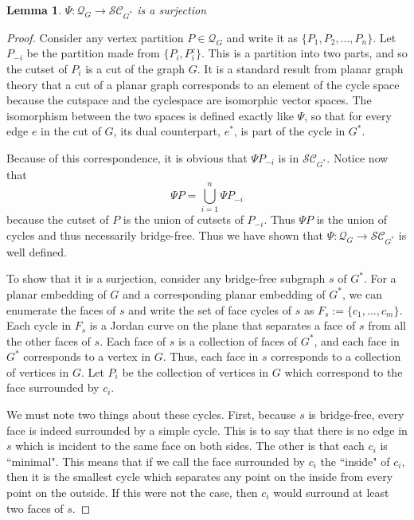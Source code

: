 \documentclass{article}
\newtheorem{lemma}{Lemma}[section]
\begin{document}
\begin{lemma}\label{lem:surjectivePsi}
    $\Psi:\mathcal{Q}_G\to \mathcal{SC}_{G^*}$ is a surjection
\end{lemma}
\begin{proof}
    Consider any vertex partition $P\in\mathcal{Q}_G$ and write it as $\{P_1,P_2,...,P_n\}.$ Let $P_{-i}$ be the partition made from $\{P_i, P_i^c\}$. This is a partition into two parts, and so the cutset of $P_i$ is a cut of the graph $G$. It is a standard result from planar graph theory \citep{FouldsGraphTheory,NishizekiPlanarGraphs,Gross2005} that a cut of a planar graph corresponds to an element of the cycle space because the cutspace and the cyclespace are isomorphic vector spaces. The isomorphism between the two spaces is defined exactly like $\Psi$, so that for every edge $e$ in the cut of $G$, its dual counterpart, $e^*$, is part of the cycle in $G^*$.

    Because of this correspondence, it is obvious that $\Psi P_{-i}$ is in $\mathcal{SC}_{G^*}$. Notice now that 
    \[\Psi P=\bigcup_{i=1}^n \Psi P_{-i}\]
    because the cutset of $P$ is the union of cutsets of $P_{-i}$. Thus $\Psi P$ is the union of cycles and thus necessarily bridge-free. Thus we have shown that $\Psi:\mathcal{Q}_G\to \mathcal{SC}_{G^*}$ is well defined.

    To show that it is a surjection, consider any bridge-free subgraph $s$ of $G^*$. For a planar embedding of $G$ and a corresponding planar embedding of $G^*$, we can enumerate the faces of $s$ and write the set of face cycles of $s$ as $F_s:=\{c_1,...,c_m\}$. Each cycle in $F_s$ is a Jordan curve on the plane that separates a face of $s$ from all the other faces of $s$. Each face of $s$ is a collection of faces of $G^*$, and each face in $G^*$ corresponds to a vertex in $G$. Thus, each face in $s$ corresponds to a collection of vertices in $G$. Let $P_i$ be the collection of vertices in $G$ which correspond to the face surrounded by $c_i$.

    We must note two things about these cycles. First, because $s$ is bridge-free, every face is indeed surrounded by a simple cycle. This is to say that there is no edge in $s$ which is incident to the same face on both sides. The other is that each $c_i$ is ``minimal". This means that if we call the face surrounded by $c_i$ the ``inside" of $c_i$, then it is the smallest cycle which separates any point on the inside from every point on the outside. If this were not the case, then $c_i$ would surround at least two faces of $s$. 


\end{proof}
\end{document}
